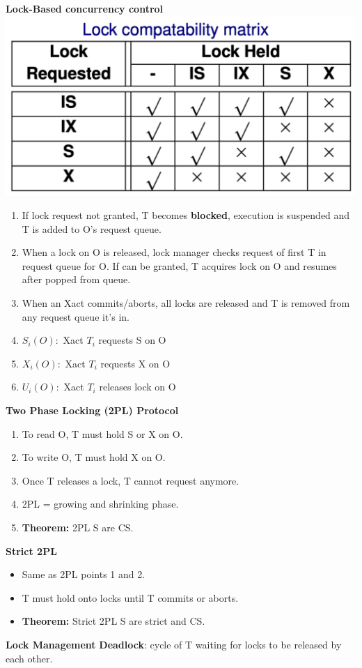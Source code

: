 \documentclass[9pt, landscape]{extarticle}
\begin{document}
\begin{multicols*}{4}
  \textbf{Lock-Based concurrency control}
  \includegraphics[width=0.4\linewidth]{cs3223-lock-matrix.png}
  \begin{enumerate}
    \item If lock request not granted, T becomes \textbf{blocked}, execution is suspended and T is added to O's request queue.
    \item When a lock on O is released, lock manager checks request of first T in request queue for O. If can be granted, T acquires lock on O and resumes after popped from queue.
    \item When an Xact commits/aborts, all locks are released and T is removed from any request queue it's in.
    \item $S_i(O):$ Xact $T_i$ requests S on O
    \item $X_i(O):$ Xact $T_i$ requests X on O
    \item $U_i(O):$ Xact $T_i$ releases lock on O
  \end{enumerate}

  \textbf{Two Phase Locking (2PL) Protocol}
  \begin{enumerate}
    \item To read O, T must hold S or X on O.
    \item To write O, T must hold X on O.
    \item Once T releases a lock, T cannot request anymore.
    \item 2PL = growing and shrinking phase.
    \item \textbf{Theorem:} 2PL S are CS.
  \end{enumerate}

  \textbf{Strict 2PL}
  \begin{itemize}
    \item Same as 2PL points 1 and 2.
    \item T must hold onto locks until T commits or aborts.
    \item \textbf{Theorem:} Strict 2PL S are strict and CS.
  \end{itemize}

  \textbf{Lock Management}
  \textbf{Deadlock}: cycle of T waiting for locks to be released by each other.

\end{multicols*}
\end{document}
